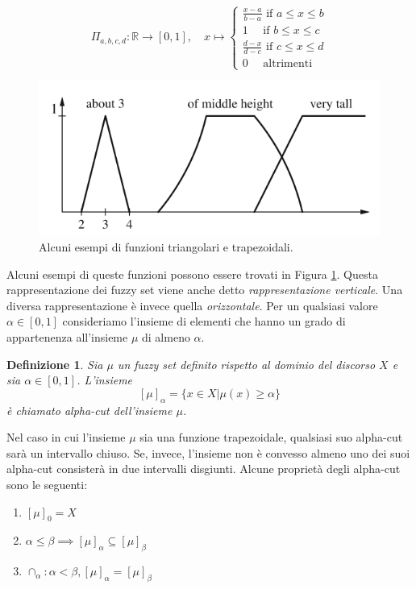 \documentclass[10pt,a4paper]{article}
\newtheorem{definition}{Definizione}
\begin{document}
$$
\Pi_{a,b,c,d} : \mathbb{R} \to [0,1],\quad x \mapsto 
\begin{cases}
\frac{x-a}{b-a} \text{ if } a \leq x \leq b \\
1 \quad \text{ if  }  b \leq x \leq c \\
\frac{d-x}{d-c} \text{ if } c \leq x \leq d \\
0 \quad \text{  altrimenti}
\end{cases}
$$

\begin{figure}
\centering
\includegraphics[scale=0.4]{img/triang.png}
\caption{Alcuni esempi di funzioni triangolari e trapezoidali.}
\label{fig:24}
\end{figure}

Alcuni esempi di queste funzioni possono essere trovati in Figura \ref{fig:24}. Questa rappresentazione dei fuzzy set viene anche detto \emph{rappresentazione verticale}. Una diversa rappresentazione è invece quella \emph{orizzontale}. Per un qualsiasi valore $\alpha \in [0,1]$ consideriamo l'insieme di elementi che hanno un grado di appartenenza all'insieme $\mu$ di almeno $\alpha$.

\begin{definition}
Sia $\mu$ un fuzzy set definito rispetto al dominio del discorso $X$ e sia $\alpha \in [0,1]$. L'insieme
$$
[\mu]_\alpha = \{x \in X | \mu(x) \geq \alpha \}
$$
è chiamato \emph{alpha-cut} dell'insieme $\mu$.
\end{definition}

Nel caso in cui l'insieme $\mu$ sia una funzione trapezoidale, qualsiasi suo alpha-cut sarà un intervallo chiuso. Se, invece, l'insieme non è convesso almeno uno dei suoi alpha-cut consisterà in due intervalli disgiunti. Alcune proprietà degli alpha-cut sono le seguenti:

\begin{enumerate}
\item{$[\mu]_0 = X$}
\item{$\alpha \leq \beta \implies [\mu]_\alpha \subseteq [\mu]_\beta $}
\item{$\cap_\alpha: \alpha < \beta, [\mu]_\alpha = [\mu]_\beta$}
\end{enumerate} 
\end{document}
